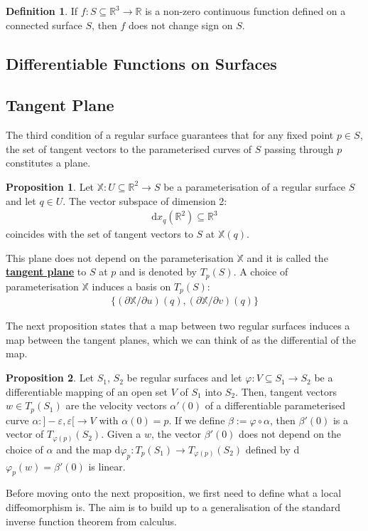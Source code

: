 \documentclass[11pt]{scrartcl}
\newcommand{\R}[0]{\mathbb{R}}
\theoremstyle{definition}
\newtheorem{definition}{Definition}
\newtheorem{prop}{Proposition}
\theoremstyle{remark}
\newcommand{\dfn}[1]{\textbf{\underline{#1}}}
\begin{document}
{\begin{definition}
	If $f: S \subseteq \R^3 \rightarrow \R$ is a non-zero continuous function defined on a connected surface $S$, then $f$ does not change sign on $S$. 
\end{definition}



\subsection{Differentiable Functions on Surfaces}

\subsection{Tangent Plane}

The third condition of a regular surface guarantees that for any fixed point $p \in S$, the set of tangent vectors to the parameterised curves of $S$ passing through $p$ constitutes a plane. 

\begin{prop}
	Let $\mathbb{X}: U \subseteq \R^2 \rightarrow S$ be a parameterisation of a regular surface $S$ and let $q \in U$. The vector subspace of dimension 2: 
	\begin{align}
		\text{d}x_q (\R^2) \subseteq \R^3 	
	\end{align}
	coincides with the set of tangent vectors to $S$ at $\mathbb{X}(q)$. 
\end{prop}
This plane does not depend on the parameterisation $\mathbb{X}$ and it is called the \dfn{tangent plane} to $S$ at $p$ and is denoted by $T_p(S)$. A choice of parameterisation $\mathbb{X}$ induces a basis on $T_p(S)$: 
\begin{align*}
	\{ (\partial \mathbb{X}/ \partial u)(q), ( \partial \mathbb{X}/ \partial v)(q) \} 
\end{align*}


The next proposition states that a map between two regular surfaces induces a map between the tangent planes, which we can think of as the differential of the map. 

\begin{prop}
	Let $S_1$, $S_2$ be regular surfaces and let $\varphi: V \subseteq S_1 \rightarrow S_2$ be a differentiable mapping of an open set $V$ of $S_1$ into $S_2$. Then, tangent vectors $w \in T_p(S_1)$ are the velocity vectors $\alpha'(0)$ of a differentiable parameterised curve $\alpha: ]-\varepsilon, \varepsilon[ \rightarrow V$ with $\alpha(0) = p$. If we define $\beta:= \varphi \circ \alpha$, then $\beta '(0)$ is a vector of $T_{\varphi(p)}(S_2)$. Given a $w$, the vector $\beta'(0)$ does not depend on the choice of $\alpha$ and the map d$\varphi_p: T_p(S_1) \rightarrow T_{\varphi(p)}(S_2)$  defined by d$\varphi_p(w) = \beta'(0)$ is linear. 
\end{prop}
Before moving onto the next proposition, we first need to define what a local diffeomorphism is. The aim is to build up to a generalisation of the standard inverse function theorem from calculus. 

}
\end{document}
